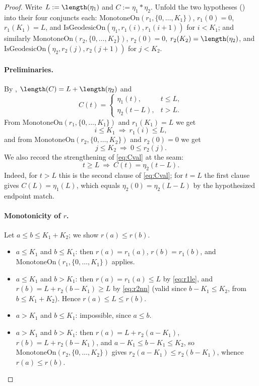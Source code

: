 \begin{proof}
  Write $L := \length(\eta_1)$ and $C := \eta_1 * \eta_2$. Unfold the two hypotheses
  () into their four conjuncts each:
  $\mathrm{MonotoneOn}(r_1,\{0,\dots,K_1\})$, $r_1(0)=0$, $r_1(K_1)=L$, and
  $\mathrm{IsGeodesicOn}(\eta_1,r_1(i),r_1(i+1))$ for $i<K_1$; and similarly
  $\mathrm{MonotoneOn}(r_2,\{0,\dots,K_2\})$, $r_2(0)=0$, $r_2(K_2)=\length(\eta_2)$, and
  $\mathrm{IsGeodesicOn}(\eta_2,r_2(j),r_2(j+1))$ for $j<K_2$.

  \paragraph{Preliminaries.} By , $\length(C) = L + \length(\eta_2)$ and
  \begin{equation}\label{eq:Cval}
    C(t) = \begin{cases} \eta_1(t), & t \le L,\\ \eta_2(t-L), & t > L.\end{cases}
  \end{equation}
  From $\mathrm{MonotoneOn}(r_1,\{0,\dots,K_1\})$ and $r_1(K_1)=L$ we get
  \begin{equation}\label{eq:r1le}
    i \le K_1 \ \Longrightarrow\ r_1(i) \le L ,
  \end{equation}
  and from $\mathrm{MonotoneOn}(r_2,\{0,\dots,K_2\})$ and $r_2(0)=0$ we get
  \begin{equation}\label{eq:r2nn}
    j \le K_2 \ \Longrightarrow\ 0 \le r_2(j) .
  \end{equation}
  We also record the strengthening of \eqref{eq:Cval} at the seam:
  \begin{equation}\label{eq:Csecond}
    t \ge L \ \Longrightarrow\ C(t) = \eta_2(t-L).
  \end{equation}
  Indeed, for $t>L$ this is the second clause of \eqref{eq:Cval}; for $t=L$ the first clause gives
  $C(L)=\eta_1(L)$, which equals $\eta_2(0) = \eta_2(L-L)$ by the hypothesized endpoint match.

  \paragraph{Monotonicity of $r$.} Let $a \le b \le K_1+K_2$; we show $r(a) \le r(b)$.
  \begin{itemize}
    \item $a \le K_1$ and $b \le K_1$: then $r(a)=r_1(a)$, $r(b)=r_1(b)$, and
      $\mathrm{MonotoneOn}(r_1,\{0,\dots,K_1\})$ applies.
    \item $a \le K_1$ and $b > K_1$: then $r(a)=r_1(a) \le L$ by \eqref{eq:r1le}, and
      $r(b) = L + r_2(b-K_1) \ge L$ by \eqref{eq:r2nn} (valid since $b-K_1 \le K_2$, from $b \le
      K_1+K_2$). Hence $r(a) \le L \le r(b)$.
    \item $a > K_1$ and $b \le K_1$: impossible, since $a \le b$.
    \item $a > K_1$ and $b > K_1$: then $r(a)=L+r_2(a-K_1)$, $r(b)=L+r_2(b-K_1)$, and $a-K_1 \le
      b-K_1 \le K_2$, so $\mathrm{MonotoneOn}(r_2,\{0,\dots,K_2\})$ gives $r_2(a-K_1) \le
      r_2(b-K_1)$, whence $r(a) \le r(b)$.
  \end{itemize}


\end{proof}
